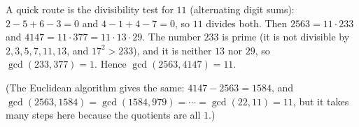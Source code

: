 A quick route is the divisibility test for $11$ (alternating digit sums): $2-5+6-3=0$ and $4-1+4-7=0$, so $11$ divides both. Then $2563=11\cdot233$ and $4147=11\cdot377=11\cdot13\cdot29$. The number $233$ is prime (it is not divisible by $2,3,5,7,11,13$, and $17^2>233$), and it is neither $13$ nor $29$, so $\gcd(233,377)=1$. Hence $\gcd(2563,4147)=\boxed{11}$.

(The Euclidean algorithm gives the same: $4147-2563=1584$, and $\gcd(2563,1584)=\gcd(1584,979)=\cdots=\gcd(22,11)=11$, but it takes many steps here because the quotients are all $1$.)
